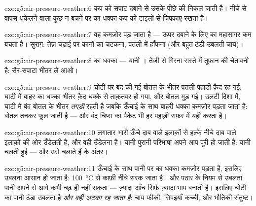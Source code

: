 \begin{solution}{exo:g5:air-pressure-weather:6}
कप को सपाट दबाने से उसके पीछे की  निकल जाती है। नीचे से वापस
धकेलने वाला कुछ न बचने पर  का धक्का कप को टाइलों से चिपकाए
रखता है।
\end{solution}

\begin{solution}{exo:g5:air-pressure-weather:7}
वह कमज़ोर पड़ जाता है --- ऊपर दबाने के लिए  का महासागर कम बचता है।
सुराग़: तेज़ चढ़ाई पर कानों का चटकना, पतली  में हाँफना (और बहुत
ठंडी उबलती चाय)।
\end{solution}

\begin{solution}{exo:g5:air-pressure-weather:8}
 का धक्का --- यानी । तेज़ी से गिरना रास्ते में तूफ़ान
की चेतावनी है: सैर-सपाटा भीतर ले आओ।
\end{solution}

\begin{solution}{exo:g5:air-pressure-weather:9}
चोटी पर बंद की गई बोतल के भीतर पतली पहाड़ी  क़ैद रह गई; घाटी में
बाहर का धक्का भीतर क़ैद धक्के से ताक़तवर हो गया, और बोतल मुड़ गई।
उलटी दिशा में, घाटी में बंद बोतल के भीतर \emph{तगड़ी}  रहती है
जबकि ऊँचाई के साथ बाहरी धक्का कमज़ोर पड़ता जाता है: बोतल तनकर फूल जाती
है --- और बंद चिप्स का पैकेट भी हर पहाड़ी सफ़र में यही करता है।
\end{solution}

\begin{solution}{exo:g5:air-pressure-weather:10}
 लगातार भारी ऊँचे दाब वाले इलाक़ों से हल्के नीचे दाब वाले इलाक़ों की
ओर उँडेलती है, और वही उँडेलना  है। यानी पुरानी परिभाषा अपने आप पूरी
हो जाती है:  यानी चलती हुई  --- और उसे चलाते हैं  के
अंतर।
\end{solution}

\begin{solution}{exo:g5:air-pressure-weather:11}
ऊँचाई के साथ पानी पर  का धक्का कमज़ोर पड़ता है, इसलिए उबलना
आसान हो जाता है:  \qty{100}{\celsius} से काफ़ी नीचे सरक जाता
है। और पठार के नियम से उबलता पानी अपने  से आगे कभी चढ़ ही
नहीं सकता --- ज़्यादा आँच सिर्फ़ ज़्यादा भाप बनाती है। इसलिए चोटी का
पानी ठंडा उबलता है \emph{और वहीं अटका रह जाता है}: चाय फीकी, सिवइयाँ
कच्ची, और भौतिकी संतुष्ट।
\end{solution}
